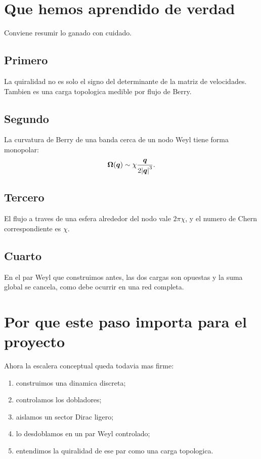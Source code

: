 \section{Que hemos aprendido de verdad}
Conviene resumir lo ganado con cuidado.

\subsection*{Primero}
La quiralidad no es solo el signo del determinante de la matriz de velocidades. Tambien es una carga topologica medible por flujo de Berry.

\subsection*{Segundo}
La curvatura de Berry de una banda cerca de un nodo Weyl tiene forma monopolar:
\begin{equation}
\bm{\Omega}(\bm{q})\sim \chi \frac{\bm{q}}{2\abs{\bm{q}}^3}.
\end{equation}

\subsection*{Tercero}
El flujo a traves de una esfera alrededor del nodo vale \(2\pi\chi\), y el numero de Chern correspondiente es \(\chi\).

\subsection*{Cuarto}
En el par Weyl que construimos antes, las dos cargas son opuestas y la suma global se cancela, como debe ocurrir en una red completa.

\section{Por que este paso importa para el proyecto}
Ahora la escalera conceptual queda todavia mas firme:
\begin{enumerate}[label=\arabic*.]
    \item construimos una dinamica discreta;
    \item controlamos los dobladores;
    \item aislamos un sector Dirac ligero;
    \item lo desdoblamos en un par Weyl controlado;
    \item entendimos la quiralidad de ese par como una carga topologica.
\end{enumerate}


